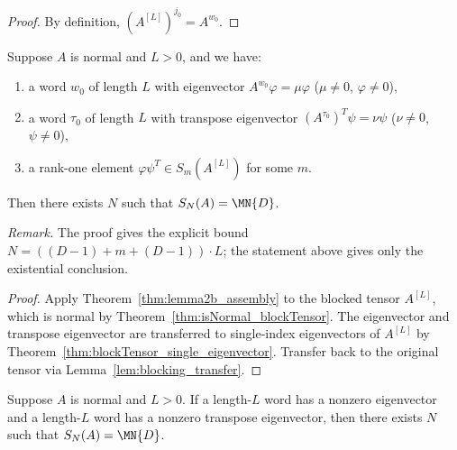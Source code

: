 \begin{proof}\leanok
    By definition, $(A^{[L]})^{j_0} = A^{w_0}$.
\end{proof}

\begin{theorem}\label{thm:wielandt_blocked_assembly}
    \leanok
    Suppose $A$ is normal and $L > 0$, and we have:
    \begin{enumerate}
        \item a word $w_0$ of length $L$ with eigenvector
              $A^{w_0} \varphi = \mu \varphi$
              ($\mu \neq 0$, $\varphi \neq 0$),
        \item a word $\tau_0$ of length $L$ with transpose
              eigenvector
              $(A^{\tau_0})^T \psi = \nu \psi$
              ($\nu \neq 0$, $\psi \neq 0$),
        \item a rank-one element
              $\varphi \psi^T \in S_m(A^{[L]})$
              for some $m$.
    \end{enumerate}
    Then there exists $N$ such that $S_N(A) = \MN{D}$.

    \noindent\emph{Remark.}
    The proof gives the explicit bound $N = ((D{-}1) + m + (D{-}1)) \cdot L$;
    the statement above gives only the existential conclusion.
\end{theorem}

\begin{proof}
    \leanok
    Apply Theorem~\ref{thm:lemma2b_assembly} to the
    blocked tensor $A^{[L]}$,
    which is normal by Theorem~\ref{thm:isNormal_blockTensor}.
    The eigenvector and transpose eigenvector are transferred
    to single-index eigenvectors of $A^{[L]}$ by
    Theorem~\ref{thm:blockTensor_single_eigenvector}.
    Transfer back to the original tensor via
    Lemma~\ref{lem:blocking_transfer}.
\end{proof}

\begin{theorem}
    \label{thm:wielandt_blocked_assembly_complete}
    \leanok
    Suppose $A$ is normal and $L > 0$. If a length-$L$ word has a nonzero
    eigenvector and a length-$L$ word has a nonzero transpose eigenvector, then
    there exists $N$ such that $S_N(A)=\MN{D}$.
\end{theorem}

